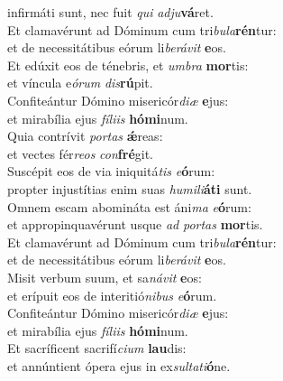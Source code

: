 \evenverse infirmáti sunt, nec fuit \textit{qui} \textit{ad}\textit{ju}\textbf{vá}ret.\\
\oddverse Et clamavérunt ad Dóminum cum tri\textit{bu}\textit{la}\textbf{rén}tur:~\*\\
\oddverse et de necessitátibus eórum li\textit{be}\textit{rá}\textit{vit} \textbf{e}os.\\
\evenverse Et edúxit eos de ténebris, et \textit{um}\textit{bra} \textbf{mor}tis:~\*\\
\evenverse et víncula e\textit{ó}\textit{rum} \textit{dis}\textbf{rú}pit.\\
\oddverse Confiteántur Dómino misericór\textit{di}\textit{æ} \textbf{e}jus:~\*\\
\oddverse et mirabília ejus \textit{fí}\textit{li}\textit{is} \textbf{hó}\textbf{mi}num.\\
\evenverse Quia contrívit \textit{por}\textit{tas} \textbf{ǽ}reas:~\*\\
\evenverse et vectes fér\textit{re}\textit{os} \textit{con}\textbf{fré}git.\\
\oddverse Suscépit eos de via iniquitá\textit{tis} \textit{e}\textbf{ó}rum:~\*\\
\oddverse propter injustítias enim suas \textit{hu}\textit{mi}\textit{li}\textbf{á}\textbf{ti} sunt.\\
\evenverse Omnem escam abomináta est áni\textit{ma} \textit{e}\textbf{ó}rum:~\*\\
\evenverse et appropinquavérunt usque \textit{ad} \textit{por}\textit{tas} \textbf{mor}tis.\\
\oddverse Et clamavérunt ad Dóminum cum tri\textit{bu}\textit{la}\textbf{rén}tur:~\*\\
\oddverse et de necessitátibus eórum li\textit{be}\textit{rá}\textit{vit} \textbf{e}os.\\
\evenverse Misit verbum suum, et sa\textit{ná}\textit{vit} \textbf{e}os:~\*\\
\evenverse et erípuit eos de interitió\textit{ni}\textit{bus} \textit{e}\textbf{ó}rum.\\
\oddverse Confiteántur Dómino misericór\textit{di}\textit{æ} \textbf{e}jus:~\*\\
\oddverse et mirabília ejus \textit{fí}\textit{li}\textit{is} \textbf{hó}\textbf{mi}num.\\
\evenverse Et sacríficent sacrifí\textit{ci}\textit{um} \textbf{lau}dis:~\*\\
\evenverse et annúntient ópera ejus in ex\textit{sul}\textit{ta}\textit{ti}\textbf{ó}ne.\\
